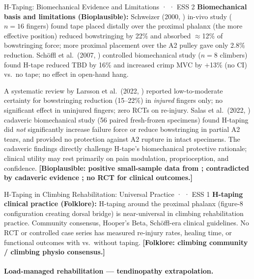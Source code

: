 \begin{bioplausbox}{H-Taping: Biomechanical Evidence and Limitations · \bioplausible · ESS 2}
\textbf{Biomechanical basis and limitations (Bioplausible):} Schweizer (2000, \cite{Sch00}) in-vivo study ($n=16$ fingers) found tape placed distally over the proximal phalanx (the more effective position) reduced bowstringing by 22\% and absorbed $\approx$12\% of bowstringing force; more proximal placement over the A2 pulley gave only 2.8\% reduction. Sch\"{o}ffl et al.\ (2007, \cite{SES+07}) controlled biomechanical study ($n=8$ climbers) found H-tape reduced TBD by 16\% and increased crimp MVC by $+$13\% (no CI) vs.\ no tape; no effect in open-hand hang.

A systematic review by Larsson et al.\ (2022, \cite{LNB22}) reported low-to-moderate certainty for bowstringing reduction (15--22\%) in \textit{injured} fingers only; no significant effect in uninjured fingers; zero RCTs on re-injury. Salas et al.\ (2022, \cite{SMT+23}) cadaveric biomechanical study (56 paired fresh-frozen specimens) found H-taping did \textit{not} significantly increase failure force or reduce bowstringing in partial A2 tears, and provided no protection against A2 rupture in intact specimens. The cadaveric findings directly challenge H-tape's biomechanical protective rationale; clinical utility may rest primarily on pain modulation, proprioception, and confidence. \textbf{[Bioplausible: positive small-sample data from \cite{Sch00,SES+07}; contradicted by cadaveric evidence \cite{SMT+23}; no RCT for clinical outcomes.]}
\end{bioplausbox}

\begin{folklorebox}{H-Taping in Climbing Rehabilitation: Universal Practice · \folkloreverified · ESS 1}
\textbf{H-taping clinical practice (Folklore):} H-taping around the proximal phalanx (figure-8 configuration creating dorsal bridge) is near-universal in climbing rehabilitation practice. Community consensus, Hooper's Beta, Schöffl-era clinical guidelines. No RCT or controlled case series has measured re-injury rates, healing time, or functional outcomes with vs.\ without taping. \textbf{[Folklore: climbing community / climbing physio consensus.]}
\end{folklorebox}

\paragraph{Load-managed rehabilitation --- tendinopathy extrapolation.}\leavevmode

